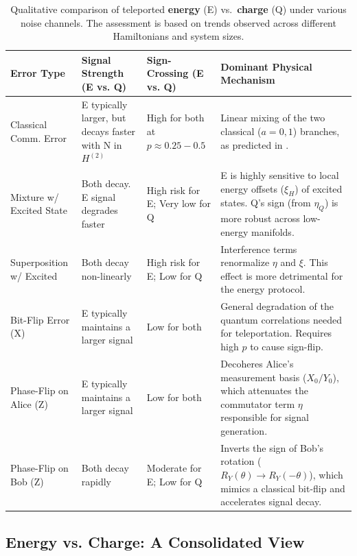 \begin{table}[t]
\small
\centering
\caption{Qualitative comparison of teleported \textbf{energy} (E) vs.\ \textbf{charge} (Q) under various noise channels. The assessment is based on trends observed across different Hamiltonians and system sizes.}
\label{tab:noise-summary-improved}
\begin{tabularx}{\textwidth}{@{} l >{\hsize=0.8\hsize}X >{\hsize=0.8\hsize}X >{\hsize=1.4\hsize}X @{}}
\toprule
\textbf{Error Type} & \textbf{Signal Strength (E vs. Q)} & \textbf{Sign-Crossing (E vs. Q)} & \textbf{Dominant Physical Mechanism} \\
\midrule
Classical Comm. Error & E typically larger, but decays faster with N in $H^{(2)}$ & High for both at $p \approx 0.25-0.5$ & Linear mixing of the two classical ($a=0, 1$) branches, as predicted in \cite{QKDbyQET}. \\
\addlinespace
Mixture w/ Excited State & Both decay. E signal degrades faster & High risk for E; Very low for Q & E is highly sensitive to local energy offsets ($\xi_H$) of excited states. Q's sign (from $\eta_Q$) is more robust across low-energy manifolds. \\
\addlinespace
Superposition w/ Excited & Both decay non-linearly & High risk for E; Low for Q & Interference terms renormalize $\eta$ and $\xi$. This effect is more detrimental for the energy protocol. \\
\addlinespace
Bit-Flip Error (X) & E typically maintains a larger signal & Low for both & General degradation of the quantum correlations needed for teleportation. Requires high $p$ to cause sign-flip. \\
\addlinespace
Phase-Flip on Alice (Z) & E typically maintains a larger signal & Low for both & Decoheres Alice's measurement basis ($X_0/Y_0$), which attenuates the commutator term $\eta$ responsible for signal generation. \\
\addlinespace
Phase-Flip on Bob (Z) & Both decay rapidly & Moderate for E; Low for Q & Inverts the sign of Bob's rotation ($R_Y(\theta) \to R_Y(-\theta)$), which mimics a classical bit-flip and accelerates signal decay. \\
\bottomrule
\end{tabularx}
\end{table}

\subsection{Energy vs. Charge: A Consolidated View}
\label{subsec:consolidated}

